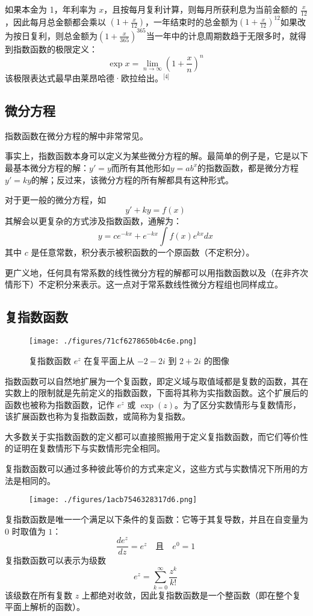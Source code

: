 如果本金为 1，年利率为 $x$，且按每月复利计算，则每月所获利息为当前金额的 $\frac{x}{12}$，因此每月总金额都会乘以 $(1 + \frac{x}{12})$，一年结束时的总金额为$(1 + \frac{x}{12})^{12}$如果改为按日复利，则总金额为$(1 + \frac{x}{365})^{365}$当一年中的计息周期数趋于无限多时，就得到指数函数的极限定义：
$$
\exp x = \lim_{n \to \infty} \left(1 + \frac{x}{n} \right)^n~
$$
该极限表达式最早由莱昂哈德·欧拉给出。\(^\text{[4]}\)
\subsection{微分方程}
指数函数在微分方程的解中非常常见。

事实上，指数函数本身可以定义为某些微分方程的解。最简单的例子是，它是以下最基本微分方程的解：$y' = y$而所有其他形如$y = a b^x$的指数函数，都是微分方程$y' = k y$的解；反过来，该微分方程的所有解都具有这种形式。

对于更一般的微分方程，如
$$
y' + k y = f(x)~
$$
其解会以更复杂的方式涉及指数函数，通解为：
$$
y = c e^{-k x} + e^{-k x} \int f(x) e^{k x}dx~
$$
其中 $c$ 是任意常数，积分表示被积函数的一个原函数（不定积分）。

更广义地，任何具有常系数的线性微分方程的解都可以用指数函数以及（在非齐次情形下）不定积分来表示。这一点对于常系数线性微分方程组也同样成立。
\subsection{复指数函数}
\begin{figure}[ht]
\centering
\texttt{[image: ./figures/71cf6278650b4c6e.png]}
\caption{复指数函数 $e^z$ 在复平面上从 $-2 - 2i$ 到 $2 + 2i$ 的图像} \label{fig_ZShs_4}
\end{figure}
指数函数可以自然地扩展为一个复函数，即定义域与取值域都是复数的函数，其在实数上的限制就是先前定义的指数函数，下面将其称为实指数函数。这个扩展后的函数也被称为指数函数，记作 $e^z$ 或 $\exp(z)$。为了区分实数情形与复数情形，该扩展函数也称为复指数函数，或简称为复指数。

大多数关于实指数函数的定义都可以直接照搬用于定义复指数函数，而它们等价性的证明在复数情形下与实数情形完全相同。

复指数函数可以通过多种彼此等价的方式来定义，这些方式与实数情况下所用的方法是相同的。
\begin{figure}[ht]
\centering
\texttt{[image: ./figures/1acb7546328317d6.png]}
\caption{} \label{fig_ZShs_5}
\end{figure}
复指数函数是唯一一个满足以下条件的复函数：它等于其复导数，并且在自变量为 $0$ 时取值为 $1$：
$$
\frac{d e^z}{dz} = e^z \quad \text{且} \quad e^0 = 1~
$$
复指数函数可以表示为级数
$$
e^z = \sum_{k=0}^{\infty} \frac{z^k}{k!}~
$$
该级数在所有复数 $z$ 上都绝对收敛，因此复指数函数是一个整函数（即在整个复平面上解析的函数）。


